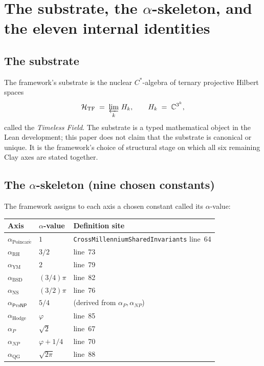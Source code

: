 \documentclass[11pt,a4paper]{article}
\theoremstyle{plain}
\theoremstyle{definition}
\begin{document}
\section{The substrate, the $\alpha$-skeleton, and the
eleven internal identities}
\label{sec:substrate}

\subsection{The substrate}
\label{sec:tf}

The framework's substrate is the nuclear $C^*$-algebra of ternary
projective Hilbert spaces
\[
\mathcal{H}_{\mathrm{TF}} \;=\; \varprojlim_{k}\, H_{k}, \qquad
H_{k} \;=\; \mathbb{C}^{3^{k}},
\]
called the \emph{Timeless Field}. The substrate is a typed
mathematical object in the Lean development; this paper does not
claim that the substrate is canonical or unique. It is the
framework's choice of structural stage on which all six remaining
Clay axes are stated together.

\subsection{The $\alpha$-skeleton (nine chosen constants)}
\label{sec:alpha-skeleton}

The framework assigns to each axis a chosen constant called its
$\alpha$-value:

\begin{center}
\renewcommand{\arraystretch}{1.20}
\begin{tabular}{lll}
\toprule
\textbf{Axis} & \textbf{$\alpha$-value} & \textbf{Definition site} \\
\midrule
$\alpha_{\mathrm{Poincar\acute e}}$ & $1$ &
  \texttt{CrossMillenniumSharedInvariants} line~64 \\
$\alpha_{\mathrm{RH}}$ & $3/2$ &
  line~73 \\
$\alpha_{\mathrm{YM}}$ & $2$ &
  line~79 \\
$\alpha_{\mathrm{BSD}}$ & $(3/4)\pi$ &
  line~82 \\
$\alpha_{\mathrm{NS}}$ & $(3/2)\pi$ &
  line~76 \\
$\alpha_{\mathsf{P}\mathrm{vs}\mathsf{NP}}$ & $5/4$ &
  (derived from $\alpha_P, \alpha_{NP}$) \\
$\alpha_{\mathrm{Hodge}}$ & $\varphi$ &
  line~85 \\
$\alpha_{P}$ & $\sqrt{2}$ &
  line~67 \\
$\alpha_{NP}$ & $\varphi + 1/4$ &
  line~70 \\
$\alpha_{\mathrm{QG}}$ & $\sqrt{2\pi}$ &
  line~88 \\
\bottomrule
\end{tabular}
\end{center}
\end{document}

